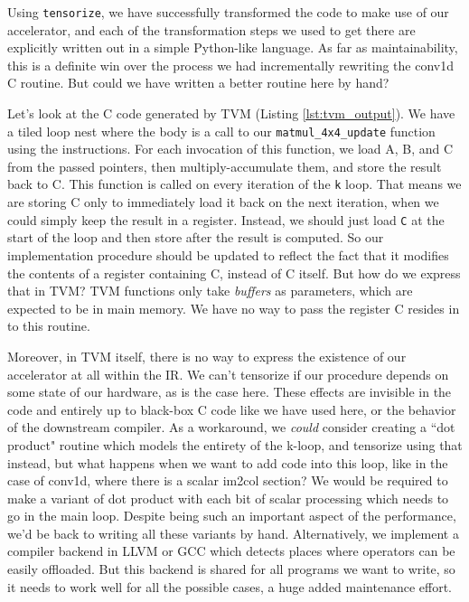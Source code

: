 \documentclass[acmsmall, nonacm=true]{acmart}
\begin{document}
Using \verb|tensorize|, we have successfully transformed the code to make use of our accelerator, and each of the transformation steps we used to get there are explicitly written out in a simple Python-like language. As far as maintainability, this is a definite win over the process we had incrementally rewriting the conv1d C routine. But could we have written a better routine here by hand? 

Let's look at the C code generated by TVM (Listing \ref{lst:tvm_output}). We have a tiled loop nest where the body is a call to our \verb|matmul_4x4_update| function using the instructions. For each invocation of this function, we load A, B, and C from the passed pointers, then multiply-accumulate them, and store the result back to C.  This function is called on every iteration of the \verb|k| loop. That means we are storing C only to immediately load it back on the next iteration, when we could simply keep the result in a register. Instead, we should just load \verb|C| at the start of the loop and then store after the result is computed. So our implementation procedure should be updated to reflect the fact that it modifies the contents of a register containing C, instead of C itself. But how do we express that in TVM? TVM functions only take \textit{buffers} as parameters, which are expected to be in main memory. We have no way to pass the register C resides in to this routine.

Moreover, in TVM itself, there is no way to express the existence of our accelerator at all within the IR. We can't tensorize if our procedure depends on some state of our hardware, as is the case here. These effects are invisible in the code and entirely up to black-box C code like we have used here, or the behavior of the downstream compiler. As a workaround, we \textit{could} consider creating a ``dot product" routine which models the entirety of the k-loop, and tensorize using that instead, but what happens when we want to add code into this loop, like in the case of conv1d, where there is a scalar im2col section? We would be required to make a variant of dot product with each bit of scalar processing which needs to go in the main loop. Despite being such an important aspect of the performance, we'd be back to writing all these variants by hand. Alternatively, we implement a compiler backend in LLVM or GCC which detects places where operators can be easily offloaded. But this backend is shared for all programs we want to write, so it needs to work well for all the possible cases, a huge added maintenance effort.
\end{document}
